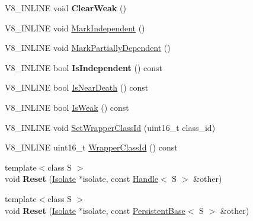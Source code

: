\begin{DoxyCompactItemize}
\item 
\hypertarget{classv8_1_1_persistent_base_afe515daead108cceb1699b54051df13b}{}V8\+\_\+\+I\+N\+L\+I\+N\+E void {\bfseries Clear\+Weak} ()\label{classv8_1_1_persistent_base_afe515daead108cceb1699b54051df13b}

\item 
V8\+\_\+\+I\+N\+L\+I\+N\+E void \hyperlink{classv8_1_1_persistent_base_aed12b0a54bc5ade1fb44e3bdb3a1fe74}{Mark\+Independent} ()
\item 
V8\+\_\+\+I\+N\+L\+I\+N\+E void \hyperlink{classv8_1_1_persistent_base_a4a876d30dda0dfb812e82bb240e4686e}{Mark\+Partially\+Dependent} ()
\item 
\hypertarget{classv8_1_1_persistent_base_a2ed93b6be1b27c299906935ef35d2114}{}V8\+\_\+\+I\+N\+L\+I\+N\+E bool {\bfseries Is\+Independent} () const \label{classv8_1_1_persistent_base_a2ed93b6be1b27c299906935ef35d2114}

\item 
V8\+\_\+\+I\+N\+L\+I\+N\+E bool \hyperlink{classv8_1_1_persistent_base_a4a64c26d91ed6a276aa8a7ca4bb7683a}{Is\+Near\+Death} () const 
\item 
V8\+\_\+\+I\+N\+L\+I\+N\+E bool \hyperlink{classv8_1_1_persistent_base_a714b7794149df483837a2c6b09d52396}{Is\+Weak} () const 
\item 
V8\+\_\+\+I\+N\+L\+I\+N\+E void \hyperlink{classv8_1_1_persistent_base_ac4c979164b3ed4dc92319e6f5a108d3d}{Set\+Wrapper\+Class\+Id} (uint16\+\_\+t class\+\_\+id)
\item 
V8\+\_\+\+I\+N\+L\+I\+N\+E uint16\+\_\+t \hyperlink{classv8_1_1_persistent_base_a01a46bf4e69ed9a837639702ee234643}{Wrapper\+Class\+Id} () const 
\item 
\hypertarget{classv8_1_1_persistent_base_a1d3ad48623c429889afb03b557c926e0}{}{\footnotesize template$<$class S $>$ }\\void {\bfseries Reset} (\hyperlink{classv8_1_1_isolate}{Isolate} $\ast$isolate, const \hyperlink{classv8_1_1_handle}{Handle}$<$ S $>$ \&other)\label{classv8_1_1_persistent_base_a1d3ad48623c429889afb03b557c926e0}

\item 
\hypertarget{classv8_1_1_persistent_base_a67cbcedf77d176d3870fa4993e300b61}{}{\footnotesize template$<$class S $>$ }\\void {\bfseries Reset} (\hyperlink{classv8_1_1_isolate}{Isolate} $\ast$isolate, const \hyperlink{classv8_1_1_persistent_base}{Persistent\+Base}$<$ S $>$ \&other)\label{classv8_1_1_persistent_base_a67cbcedf77d176d3870fa4993e300b61}


\end{DoxyCompactItemize}
